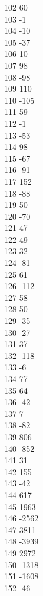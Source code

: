 { 102	60 \\
 103	-1 \\
 104	-10 \\
 105	-37 \\
 106	10 \\
 107	98 \\
 108	-98 \\
 109	110 \\
 110	-105 \\
 111	59 \\
 112	-1 \\
 113	-53 \\
 114	98 \\
 115	-67 \\
 116	-91 \\
 117	152 \\
 118	-88 \\
 119	50 \\
 120	-70 \\
 121	47 \\
 122	49 \\
 123	32 \\
 124	-81 \\
 125	61 \\
 126	-112 \\
 127	58 \\
 128	50 \\
 129	-35 \\
 130	-27 \\
 131	37 \\
 132	-118 \\
 133	-6 \\
 134	77 \\
 135	64 \\
 136	-42 \\
 137	7 \\
 138	-82 \\
 139	806 \\
 140	-852 \\
 141	31 \\
 142	155 \\
 143	-42 \\
 144	617 \\
 145	1963 \\
 146	-2562 \\
 147	3811 \\
 148	-3939 \\
 149	2972 \\
 150	-1318 \\
 151	-1608 \\
 152	-46 \\
}
